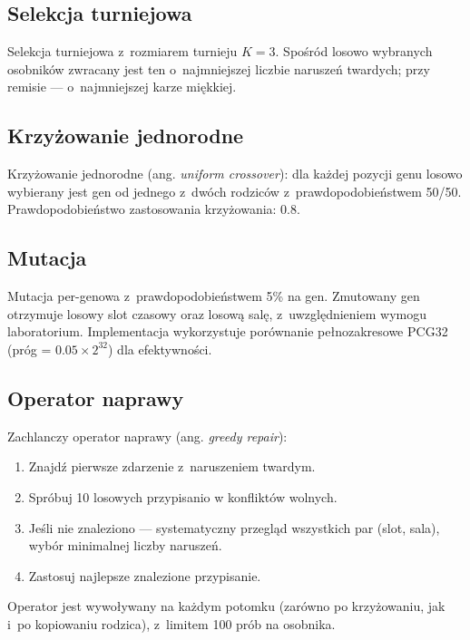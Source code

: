 \documentclass[12pt,a4paper]{article}
\begin{document}
\subsection{Selekcja turniejowa}

Selekcja turniejowa z~rozmiarem turnieju $K = 3$. Spo\'{s}r\'{o}d losowo wybranych osobnik\'{o}w zwracany jest ten o~najmniejszej liczbie narusze\'{n} twardych; przy remisie --- o~najmniejszej karze mi\k{e}kkiej.

\subsection{Krzy\.{z}owanie jednorodne}

Krzy\.{z}owanie jednorodne (ang. \textit{uniform crossover}): dla ka\.{z}dej pozycji genu losowo wybierany jest gen od jednego z~dw\'{o}ch rodzic\'{o}w z~prawdopodobie\'{n}stwem 50/50. Prawdopodobie\'{n}stwo zastosowania krzy\.{z}owania: 0.8.

\subsection{Mutacja}

Mutacja per-genowa z~prawdopodobie\'{n}stwem 5\% na gen. Zmutowany gen otrzymuje losowy slot czasowy oraz losow\k{a} sal\k{e}, z~uwzgl\k{e}dnieniem wymogu laboratorium. Implementacja wykorzystuje por\'{o}wnanie pe\l{}nozakresowe PCG32 (pr\'{o}g = $0.05 \times 2^{32}$) dla efektywno\'{s}ci.

\subsection{Operator naprawy}

Zachlanczy operator naprawy (ang. \textit{greedy repair}):
\begin{enumerate}
  \item Znajd\'{z} pierwsze zdarzenie z~naruszeniem twardym.
  \item Spr\'{o}buj 10 losowych przypisanio w konflikt\'{o}w wolnych.
  \item Je\'{s}li nie znaleziono --- systematyczny przegl\k{a}d wszystkich par (slot, sala), wyb\'{o}r minimalnej liczby narusze\'{n}.
  \item Zastosuj najlepsze znalezione przypisanie.
\end{enumerate}
Operator jest wywo\l{}ywany na ka\.{z}dym potomku (zar\'{o}wno po krzy\.{z}owaniu, jak i~po kopiowaniu rodzica), z~limitem 100 pr\'{o}b na osobnika.
\end{document}
